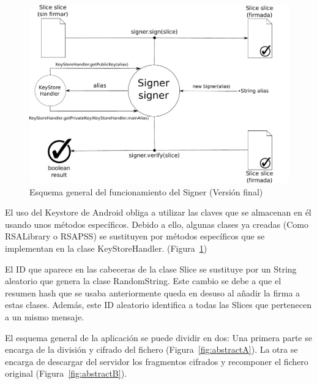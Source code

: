 \begin{figure}[!htb]
  \centering
  \includegraphics[scale=0.5]{Figures/Signer_2}
  \decoRule
  \caption[Signer (Versión final)]{Esquema general del funcionamiento del Signer (Versión final)}
  \label{fig:Signer_2}
\end{figure}

El uso del Keystore de Android obliga a utilizar las claves que se almacenan en
él usando unos métodos específicos. Debido a ello, algunas clases ya creadas
(Como RSALibrary o RSAPSS) se sustituyen por métodos específicos que se
implementan en la clase KeyStoreHandler. (Figura~\ref{fig:Signer_2})


El ID que aparece en las cabeceras de la clase Slice se sustituye por un String
aleatorio que genera la clase RandomString. Este cambio se debe a que el resumen
hash que se usaba anteriormente queda en desuso al añadir la firma a estas
clases. Además, este ID aleatorio identifica a todas las Slices que pertenecen
a un mismo mensaje.

El esquema general de la aplicación se puede dividir en dos: Una primera parte
se encarga de la división y cifrado del fichero (Figura~\ref{fig:abstractA}). La
otra se encarga de descargar del servidor los fragmentos cifrados y recomponer
el fichero original (Figura~\ref{fig:abstractB}).

